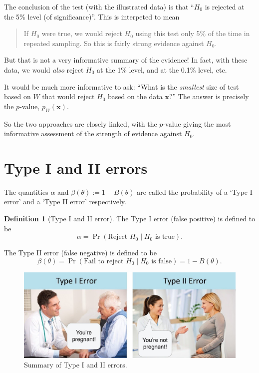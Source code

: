 \documentclass[
]{book}
\newcommand{\bx}{{\boldsymbol x}}
\theoremstyle{definition}
\newtheorem{definition}{Definition}[chapter]
\theoremstyle{definition}
\theoremstyle{definition}
\theoremstyle{definition}
\theoremstyle{remark}
\begin{document}
The conclusion of the test (with the illustrated data) is that ``\(H_0\) is rejected at the 5\% level (of significance)''. This is interpeted to mean
\vspace{.5em}

\begin{quote}
If \(H_0\) were true, we would reject \(H_0\) using this test only 5\% of the time in repeated sampling. So this is fairly strong evidence against \(H_0\).
\end{quote}

But that is not a very informative summary of the evidence! In fact, with these data, we would \emph{also} reject \(H_0\) at the 1\% level, and at the 0.1\% level, etc.

It would be much more informative to ask: ``What is the \emph{smallest} size of test based on \(W\) that would reject \(H_0\) based on the data \(\bx\)?'' The answer is precisely the \(p\)-value, \(p_W(\bx)\).

So the two approaches are closely linked, with the \(p\)-value giving the most informative assessment of the strength of evidence against \(H_0\).

\hypertarget{type-i-and-ii-errors}{%
\section{Type I and II errors}\label{type-i-and-ii-errors}}

The quantities \(\alpha\) and \(\beta(\theta):= 1-B(\theta)\) are called the probability of a `Type I error' and a `Type II error' respectively.

\begin{definition}[Type I and II error]
The Type I error (false positive) is defined to be
\[
\alpha = \Pr(\text{Reject } H_0 \mid H_0 \text{ is true}).
\]

The Type II error (false negative) is defined to be
\[
\beta(\theta) =  \Pr(\text{Fail to reject } H_0 \mid H_0 \text{ is false}) = 1 - B(\theta).
\]
\end{definition}

\begin{figure}

{\centering \includegraphics[width=0.8\linewidth]{figure/type12error} 

}

\caption{Summary of Type I and II errors.}\label{fig:type12error}
\end{figure}
\end{document}
